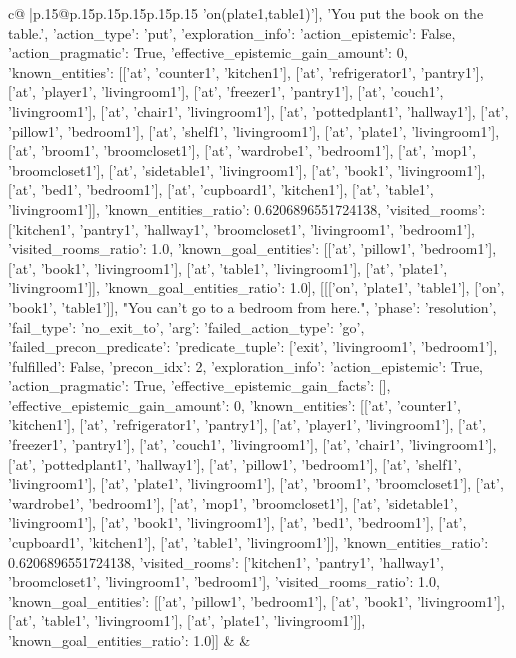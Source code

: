 \documentclass{article}
\begin{document}
{\begin{supertabular}{c@{$\;$}|p{.15\linewidth}@{}p{.15\linewidth}p{.15\linewidth}p{.15\linewidth}p{.15\linewidth}p{.15\linewidth}}
{{{'on(plate1,table1)'], 'You put the book on the table.', {'action_type': 'put', 'exploration_info': {'action_epistemic': False, 'action_pragmatic': True, 'effective_epistemic_gain_amount': 0, 'known_entities': [['at', 'counter1', 'kitchen1'], ['at', 'refrigerator1', 'pantry1'], ['at', 'player1', 'livingroom1'], ['at', 'freezer1', 'pantry1'], ['at', 'couch1', 'livingroom1'], ['at', 'chair1', 'livingroom1'], ['at', 'pottedplant1', 'hallway1'], ['at', 'pillow1', 'bedroom1'], ['at', 'shelf1', 'livingroom1'], ['at', 'plate1', 'livingroom1'], ['at', 'broom1', 'broomcloset1'], ['at', 'wardrobe1', 'bedroom1'], ['at', 'mop1', 'broomcloset1'], ['at', 'sidetable1', 'livingroom1'], ['at', 'book1', 'livingroom1'], ['at', 'bed1', 'bedroom1'], ['at', 'cupboard1', 'kitchen1'], ['at', 'table1', 'livingroom1']], 'known_entities_ratio': 0.6206896551724138, 'visited_rooms': ['kitchen1', 'pantry1', 'hallway1', 'broomcloset1', 'livingroom1', 'bedroom1'], 'visited_rooms_ratio': 1.0, 'known_goal_entities': [['at', 'pillow1', 'bedroom1'], ['at', 'book1', 'livingroom1'], ['at', 'table1', 'livingroom1'], ['at', 'plate1', 'livingroom1']], 'known_goal_entities_ratio': 1.0}}], [[['on', 'plate1', 'table1'], ['on', 'book1', 'table1']], "You can't go to a bedroom from here.", {'phase': 'resolution', 'fail_type': 'no_exit_to', 'arg': {'failed_action_type': 'go', 'failed_precon_predicate': {'predicate_tuple': ['exit', 'livingroom1', 'bedroom1'], 'fulfilled': False, 'precon_idx': 2}}, 'exploration_info': {'action_epistemic': True, 'action_pragmatic': True, 'effective_epistemic_gain_facts': [], 'effective_epistemic_gain_amount': 0, 'known_entities': [['at', 'counter1', 'kitchen1'], ['at', 'refrigerator1', 'pantry1'], ['at', 'player1', 'livingroom1'], ['at', 'freezer1', 'pantry1'], ['at', 'couch1', 'livingroom1'], ['at', 'chair1', 'livingroom1'], ['at', 'pottedplant1', 'hallway1'], ['at', 'pillow1', 'bedroom1'], ['at', 'shelf1', 'livingroom1'], ['at', 'plate1', 'livingroom1'], ['at', 'broom1', 'broomcloset1'], ['at', 'wardrobe1', 'bedroom1'], ['at', 'mop1', 'broomcloset1'], ['at', 'sidetable1', 'livingroom1'], ['at', 'book1', 'livingroom1'], ['at', 'bed1', 'bedroom1'], ['at', 'cupboard1', 'kitchen1'], ['at', 'table1', 'livingroom1']], 'known_entities_ratio': 0.6206896551724138, 'visited_rooms': ['kitchen1', 'pantry1', 'hallway1', 'broomcloset1', 'livingroom1', 'bedroom1'], 'visited_rooms_ratio': 1.0, 'known_goal_entities': [['at', 'pillow1', 'bedroom1'], ['at', 'book1', 'livingroom1'], ['at', 'table1', 'livingroom1'], ['at', 'plate1', 'livingroom1']], 'known_goal_entities_ratio': 1.0}}]] 
	  } 
	   } 
	   } 
	 & & \\ 
 


\end{supertabular}}
\end{document}
